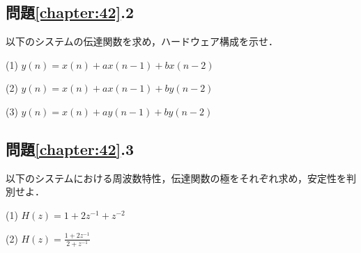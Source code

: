 \subsection*{問題\ref{chapter:42}.2}

以下のシステムの伝達関数を求め，ハードウェア構成を示せ．

(1) $y(n)=x(n)+ax(n-1)+bx(n-2)$

(2) $y(n)=x(n)+ax(n-1)+by(n-2)$

(3) $y(n)=x(n)+ay(n-1)+by(n-2)$

\subsection*{問題\ref{chapter:42}.3}

以下のシステムにおける周波数特性，伝達関数の極をそれぞれ求め，安定性を判別せよ．

(1) $H(z)=1+2z^{-1}+z^{-2}$

(2) $H(z)=\displaystyle \frac{1+2z^{-1}}{2+z^{-1}}$


